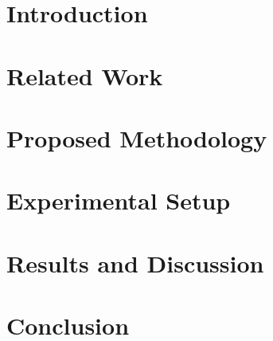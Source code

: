 \documentclass[conference]{IEEEtran}
\begin{document}
\section{Introduction}


\section{Related Work}


\section{Proposed Methodology}


\section{Experimental Setup}


\section{Results and Discussion}


\section{Conclusion}




\end{document}
